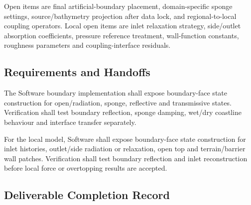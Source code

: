 Open items are final artificial-boundary placement, domain-specific
sponge settings, source/bathymetry projection after data lock, and
regional-to-local coupling operators. Local open items are inlet
relaxation strategy, side/outlet absorption coefficients, pressure
reference treatment, wall-function constants, roughness parameters and
coupling-interface residuals.

\subsection{Requirements and Handoffs}
\label{sec:res-num-ibc-requirements}


The Software boundary implementation shall expose boundary-face state
construction for open/radiation, sponge, reflective and transmissive
states. Verification shall test boundary reflection, sponge damping,
wet/dry coastline behaviour and interface transfer separately.

For the local model, Software shall expose boundary-face state
construction for inlet histories, outlet/side radiation or relaxation,
open top and terrain/barrier wall patches. Verification shall test
boundary reflection and inlet reconstruction before local force or
overtopping results are accepted.

\subsection{Deliverable Completion Record}
\label{sec:res-num-ibc-completion-record}

%
%
%
